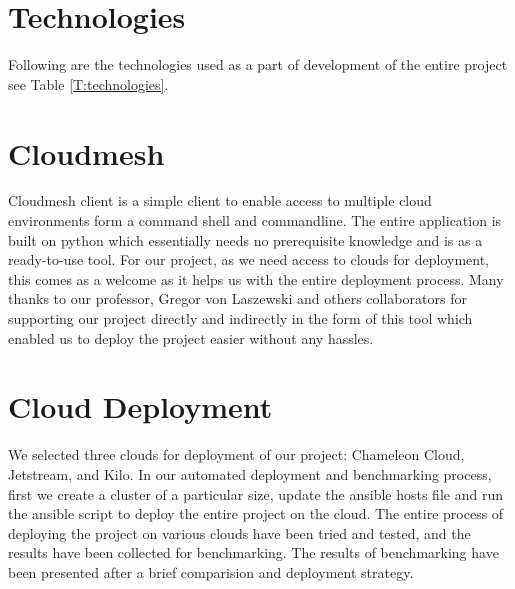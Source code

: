 \documentclass[9pt,twocolumn,twoside]{../../styles/osajnl}
\begin{document}
\section{Technologies}
Following are the technologies used as a part of development of the entire 
project see Table \ref{T:technologies}.
\begin{table}[htb]
\caption{Technologies} 
\label{T:technologies}
\centering
{}
\end{table}

\section{Cloudmesh}
Cloudmesh client is a simple client to enable access to multiple cloud
environments form a command shell and commandline. The entire
application is built on python which essentially needs no prerequisite
knowledge and is as a ready-to-use tool. For our project, as we need
access to clouds for deployment, this comes as a welcome as it helps
us with the entire deployment process. Many thanks to our professor,
Gregor von Laszewski and others collaborators for supporting our
project directly and indirectly in the form of this tool which enabled
us to deploy the project easier without any hassles.

\section{Cloud Deployment}
We selected three clouds for deployment of our project: Chameleon
Cloud, Jetstream, and Kilo. In our automated deployment and
benchmarking process, first we create a cluster of a particular size,
update the ansible hosts file and run the ansible script to deploy the
entire project on the cloud. The entire process of deploying the
project on various clouds have been tried and tested, and the results
have been collected for benchmarking. The results of benchmarking have
been presented after a brief comparision and deployment
strategy.
\end{document}
